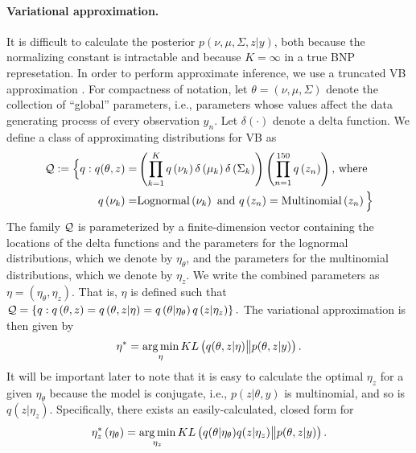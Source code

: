 %
\paragraph{Variational approximation.}
It is difficult to calculate the posterior $p\left(\nu, \mu, \Sigma, z \vert
y\right)$, both because the normalizing constant is intractable and because
$K=\infty$ in a true BNP represetation. In order to perform approximate
inference, we use a truncated VB approximation
\citep{blei:2006:dirichletbnp}. For compactness of notation, let $\theta =
\left(\nu, \mu, \Sigma\right)$ denote the collection of ``global'' parameters,
i.e., parameters whose values affect the data generating process of every
observation $y_n$.   Let $\delta\left(\cdot\right)$ denote a delta function. We
define a class of approximating distributions for VB as
%
\begin{align*}
\mathcal{Q} := \Big\{ q:
q(\theta, z) = &
\left(\prod_{k=1}^{K}q\left(\nu_{k}\right)\delta\left(\mu_{k}\right)
    \delta\left(\Sigma_{k}\right)\right)
    \left(\prod_{n=1}^{150}q\left(z_{n}\right) \right)\textrm{, where } \\
q\left(\nu_{k}\right) =& \mathrm{Lognormal}\left(\nu_k\right) \textrm{ and }
q\left(z_n\right) = \mathrm{Multinomial}\left(z_n\right)
\Big\}
\end{align*}
%
The family $\mathcal{Q}$ is parameterized by a finite-dimension vector containing
the locations of the delta functions and the parameters for the lognormal
distributions, which we denote by $\eta_\theta$, and the parameters for the
multinomial distributions, which we denote by $\eta_z$.
We write the combined parameters as $\eta=\left(\eta_\theta, \eta_z\right)$.
That is, $\eta$ is defined such that
%
$\mathcal{Q} =
    \left\{q: q\left(\theta, z\right) =
            q\left(\theta, z \vert \eta \right) =
            q\left(\theta \vert \eta_\theta \right)
            q\left(z \vert \eta_z \right)
    \right\}.$
%
The variational approximation is then given by
%
\begin{align}
\eta^{*} = \operatorname*{arg\,min}_{\eta} KL\left(
    q(\theta, z \vert \eta) \big\| p(\theta, z | y)
    \right). \label{eq:kl_objective}
\end{align}
%
It will be important later to note that it is easy to calculate
the optimal $\eta_z$ for a given $\eta_\theta$ because the model is
conjugate, i.e., $p\left(z \vert \theta, y\right)$ is multinomial,
and so is $q\left(z \vert \eta_z\right)$.  Specifically, there
exists an easily-calculated, closed form for
%
\begin{align}
\eta_z^{*}\left(\eta_\theta\right) = \operatorname*{arg\,min}_{\eta_z}
    KL\left(
    q(\theta \vert \eta_\theta) q( z \vert \eta_z)
        \big\| p(\theta, z | y)
    \right).
\label{eq:z_update}
\end{align}
%

